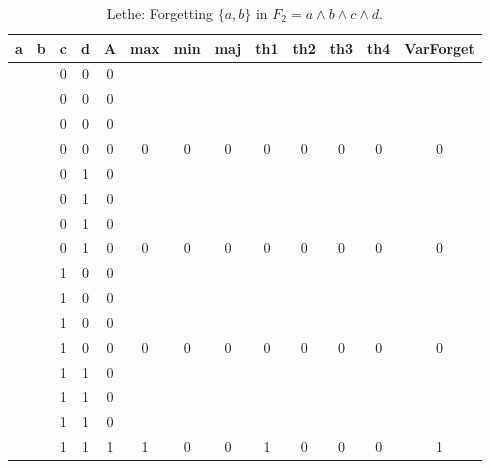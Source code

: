 \begin{table}[!tb]
    \centering
    \begin{tabular}{|c|c|c|c|c|c|c|c|c|c|c|c|c|}
        \hline
        \textbf{a} & \textbf{b} & \textbf{c} & \textbf{d} & \textbf{A} & \textbf{max} & \textbf{min} & \textbf{maj} & \textbf{th1} & \textbf{th2} & \textbf{th3} & \textbf{th4} & \textbf{VarForget} \\ \hline
        \rowcolor{gray!40}  &  & 0 & 0 & 0 &  &  &  &  &  &  &  &  \\ \hline
        \rowcolor{gray!40}  &  & 0 & 0 & 0 &  &  &  &  &  &  &  &  \\ \hline
        \rowcolor{gray!40}  &  & 0 & 0 & 0 &  &  &  &  &  &  &  &  \\ \hline
        \rowcolor{gray!40}  &  & 0 & 0 & 0 & 0 & 0 & 0 & 0 & 0 & 0 & 0 & 0 \\ \hline
        \rowcolor{blue!40}  &  & 0 & 1 & 0 &  &  &  &  &  &  &  &  \\ \hline
        \rowcolor{blue!40}  &  & 0 & 1 & 0 &  &  &  &  &  &  &  &  \\ \hline
        \rowcolor{blue!40}  &  & 0 & 1 & 0 &  &  &  &  &  &  &  &  \\ \hline
        \rowcolor{blue!40}  &  & 0 & 1 & 0 & 0 & 0 & 0 & 0 & 0 & 0 & 0 & 0 \\ \hline
        \rowcolor{red!40}  &  & 1 & 0 & 0 &  &  &  &  &  &  &  &  \\ \hline
        \rowcolor{red!40}  &  & 1 & 0 & 0 &  &  &  &  &  &  &  &  \\ \hline
        \rowcolor{red!40}  &  & 1 & 0 & 0 &  &  &  &  &  &  &  &  \\ \hline
        \rowcolor{red!40}  &  & 1 & 0 & 0 & 0 & 0 & 0 & 0 & 0 & 0 & 0 & 0 \\ \hline
        \rowcolor{green!40}  &  & 1 & 1 & 0 &  &  &  &  &  &  &  &  \\ \hline
        \rowcolor{green!40}  &  & 1 & 1 & 0 &  &  &  &  &  &  &  &  \\ \hline
        \rowcolor{green!40}  &  & 1 & 1 & 0 &  &  &  &  &  &  &  &  \\ \hline
        \rowcolor{green!40}  &  & 1 & 1 & 1 & 1 & 0 & 0 & 1 & 0 & 0 & 0 & 1 \\ \hline
    \end{tabular}
    \caption{Lethe: Forgetting $\{a, b\}$ in $F_{2} = a \land b \land c \land d$.}
    \label{tab:lethe-F2-ab}
\end{table}
